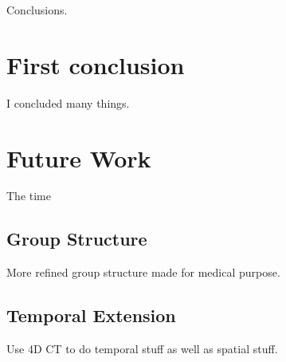 


Conclusions.

\section{First conclusion}

I concluded many things.

\section{Future Work}

The time

\subsection{Group Structure}

More refined group structure made for medical purpose.

\subsection{Temporal Extension}

Use 4D CT to do temporal stuff as well as spatial stuff.

\endinput
